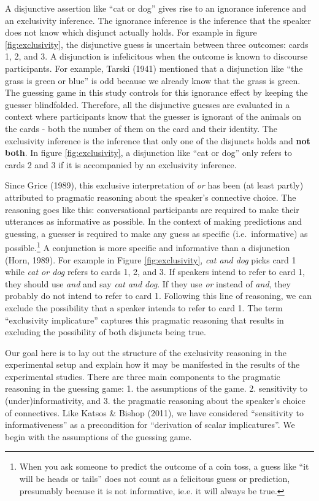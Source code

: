 \documentclass[floatsintext,man]{apa6}
\theoremstyle{definition}
\theoremstyle{definition}
\theoremstyle{definition}
\theoremstyle{remark}
\begin{document}
A disjunctive assertion like \enquote{cat or dog} gives rise to an
ignorance inference and an exclusivity inference. The ignorance
inference is the inference that the speaker does not know which disjunct
actually holds. For example in figure \ref{fig:exclusivity}, the
disjunctive guess is uncertain between three outcomes: cards 1, 2, and
3. A disjunction is infelicitous when the outcome is known to discourse
participants. For example, Tarski (1941) mentioned that a disjunction
like \enquote{the grass is green or blue} is odd because we already know
that the grass is green. The guessing game in this study controls for
this ignorance effect by keeping the guesser blindfolded. Therefore, all
the disjunctive guesses are evaluated in a context where participants
know that the guesser is ignorant of the animals on the cards - both the
number of them on the card and their identity. The exclusivity inference
is the inference that only one of the disjuncts holds and \textbf{not
both}. In figure \ref{fig:exclusivity}, a disjunction like \enquote{cat
or dog} only refers to cards 2 and 3 if it is accompanied by an
exclusivity inference.

Since Grice (1989), this exclusive interpretation of \emph{or} has been
(at least partly) attributed to pragmatic reasoning about the speaker's
connective choice. The reasoning goes like this: conversational
participants are required to make their utterances as informative as
possible. In the context of making predictions and guessing, a guesser
is required to make any guess as specific (i.e.~informative) as
possible.\footnote{When you ask someone to predict the outcome of a coin
  toss, a guess like \enquote{it will be heads or tails} does not count
  as a felicitous guess or prediction, presumably because it is not
  informative, ie.e. it will always be true.} A conjunction is more
specific and informative than a disjunction (Horn, 1989). For example in
Figure \ref{fig:exclusivity}, \emph{cat and dog} picks card 1 while
\emph{cat or dog} refers to cards 1, 2, and 3. If speakers intend to
refer to card 1, they should use \emph{and} and say \emph{cat and dog}.
If they use \emph{or} instead of \emph{and}, they probably do not intend
to refer to card 1. Following this line of reasoning, we can exclude the
possibility that a speaker intends to refer to card 1. The term
\enquote{exclusivity implicature} captures this pragmatic reasoning that
results in excluding the possibility of both disjuncts being true.

Our goal here is to lay out the structure of the exclusivity reasoning
in the experimental setup and explain how it may be manifested in the
results of the experimental studies. There are three main components to
the pragmatic reasoning in the guessing game: 1. the assumptions of the
game. 2. sensitivity to (under)informativity, and 3. the pragmatic
reasoning about the speaker's choice of connectives. Like Katsos \&
Bishop (2011), we have considered \enquote{sensitivity to
informativeness} as a precondition for \enquote{derivation of scalar
implicatures}. We begin with the assumptions of the guessing game.
\end{document}
